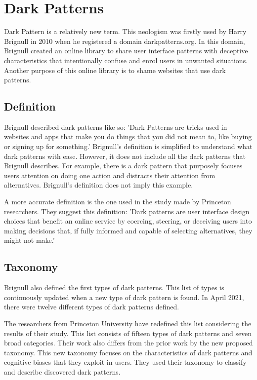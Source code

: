 \chapter{Dark Patterns}
Dark Pattern is a relatively new term. This neologism was firstly used by Harry Brignull in 2010\cite{dark-patterns-arstechnica} when he registered a domain darkpatterns.org. In this domain, Brignull created an online library to share user interface patterns with deceptive characteristics that intentionally confuse and enrol users in unwanted situations. Another purpose of this online library is to shame websites that use dark patterns.

\section{Definition}
Brignull described dark patterns like so: 'Dark Patterns are tricks used in websites and apps that make you do things that you did not mean to, like buying or signing up for something.'\cite{dark-patterns-brignull} Brignull's definition is simplified to understand what dark patterns with ease. However, it does not include all the dark patterns that Brignull describes. For example, there is a dark pattern that purposely focuses users attention on doing one action and distracts their attention from alternatives. Brignull's definition does not imply this example.

A more accurate definition is the one used in the study made by Princeton researchers. They suggest this definition: 'Dark patterns are user interface design choices that benefit an online service by coercing, steering, or deceiving users into making decisions that, if fully informed and capable of selecting alternatives, they might not make.' \cite{dark-patterns-at-scale}
\section{Taxonomy}

Brignull also defined the first types of dark patterns. This list of types is continuously updated when a new type of dark pattern is found. In April 2021, there were twelve different types of dark patterns defined\cite{dark-patterns-brignull-types}.

The researchers from Princeton University have redefined this list considering the results of their study. This list consists of fifteen types of dark patterns and seven broad categories. Their work also differs from the prior work\cite{dark-patterns-brignull,taxonomies-tales,taxonomies-conti} by the new proposed taxonomy. This new taxonomy focuses on the characteristics of dark patterns and cognitive biases that they exploit in users. They used their taxonomy to classify and describe discovered dark patterns.


